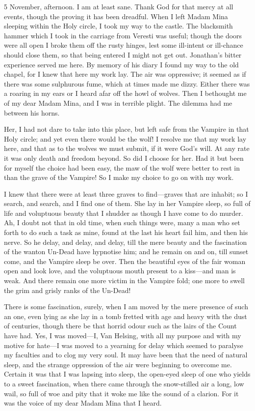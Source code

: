 \begin{diary}{5 November, afternoon.}
I am at least sane. Thank God for that mercy at all events, though the proving it has been dreadful. When I left Madam Mina sleeping within the Holy circle, I took my way to the castle. The blacksmith hammer which I took in the carriage from Veresti was useful; though the doors were all open I broke them off the rusty hinges, lest some ill-intent or ill-chance should close them, so that being entered I might not get out. Jonathan's bitter experience served me here. By memory of his diary I found my way to the old chapel, for I knew that here my work lay. The air was oppressive; it seemed as if there was some sulphurous fume, which at times made me dizzy. Either there was a roaring in my ears or I heard afar off the howl of wolves. Then I bethought me of my dear Madam Mina, and I was in terrible plight. The dilemma had me between his horns.

Her, I had not dare to take into this place, but left safe from the Vampire in that Holy circle; and yet even there would be the wolf! I resolve me that my work lay here, and that as to the wolves we must submit, if it were God's will. At any rate it was only death and freedom beyond. So did I choose for her. Had it but been for myself the choice had been easy, the maw of the wolf were better to rest in than the grave of the Vampire! So I make my choice to go on with my work.

I knew that there were at least three graves to find—graves that are inhabit; so I search, and search, and I find one of them. She lay in her Vampire sleep, so full of life and voluptuous beauty that I shudder as though I have come to do murder. Ah, I doubt not that in old time, when such things were, many a man who set forth to do such a task as mine, found at the last his heart fail him, and then his nerve. So he delay, and delay, and delay, till the mere beauty and the fascination of the wanton Un-Dead have hypnotise him; and he remain on and on, till sunset come, and the Vampire sleep be over. Then the beautiful eyes of the fair woman open and look love, and the voluptuous mouth present to a kiss—and man is weak. And there remain one more victim in the Vampire fold; one more to swell the grim and grisly ranks of the Un-Dead!\textellipsis

There is some fascination, surely, when I am moved by the mere presence of such an one, even lying as she lay in a tomb fretted with age and heavy with the dust of centuries, though there be that horrid odour such as the lairs of the Count have had. Yes, I was moved—I, Van Helsing, with all my purpose and with my motive for hate—I was moved to a yearning for delay which seemed to paralyse my faculties and to clog my very soul. It may have been that the need of natural sleep, and the strange oppression of the air were beginning to overcome me. Certain it was that I was lapsing into sleep, the open-eyed sleep of one who yields to a sweet fascination, when there came through the snow-stilled air a long, low wail, so full of woe and pity that it woke me like the sound of a clarion. For it was the voice of my dear Madam Mina that I heard.


\end{diary}
